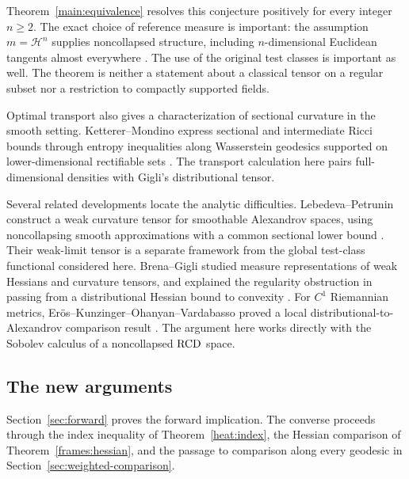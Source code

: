 Theorem~\ref{main:equivalence} resolves this conjecture positively
for every integer \(n\ge2\).
The exact choice of reference measure is important:
the assumption \(m=\mathcal H^n\) supplies noncollapsed structure,
including \(n\)-dimensional Euclidean tangents almost everywhere
\cite{DPG2018}.
The use of the original test classes is important as well.
The theorem is neither a statement about a classical tensor on a
regular subset nor a restriction to compactly supported fields.

Optimal transport also gives a characterization of sectional
curvature in the smooth setting. Ketterer--Mondino express sectional
and intermediate Ricci bounds through entropy inequalities along
Wasserstein geodesics supported on lower-dimensional rectifiable
sets \cite{KettererMondino2018}. The transport calculation here pairs
full-dimensional densities with Gigli's distributional tensor.

Several related developments locate the analytic difficulties.
Lebedeva--Petrunin construct a weak curvature tensor for smoothable
Alexandrov spaces, using noncollapsing smooth approximations with a
common sectional lower bound \cite{LebedevaPetrunin2024}. Their weak-limit
tensor is a separate framework from the global test-class functional
considered here.
Brena--Gigli studied measure representations of weak Hessians and
curvature tensors, and explained the regularity obstruction in
passing from a distributional Hessian bound to convexity
\cite[Remark~2.4 and Remark~2.18]{BrenaGigli2024}.
For \(C^1\) Riemannian metrics, Er\"os--Kunzinger--Ohanyan--Vardabasso
proved a local distributional-to-Alexandrov comparison result
\cite[Theorem~3.1]{EKOV2026}.
The argument here works directly with the Sobolev calculus of a
noncollapsed \(\mathrm{RCD}\) space.

\subsection{The new arguments}

Section~\ref{sec:forward} proves the forward implication.
The converse proceeds through the index inequality of
Theorem~\ref{heat:index}, the Hessian comparison of
Theorem~\ref{frames:hessian}, and the passage to comparison along
every geodesic in Section~\ref{sec:weighted-comparison}.

